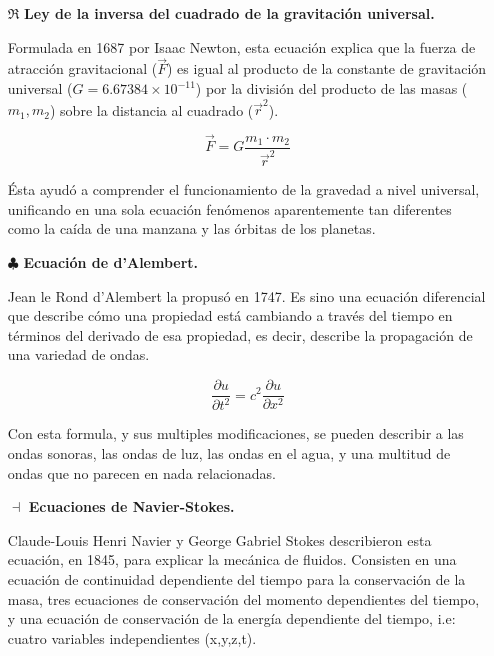 \documentclass[12pt,letterpaper]{article}
\begin{document}
\begin{itemize}

    \item[$\Re$] \textbf{Ley de la inversa del cuadrado de la gravitación universal.}\newline
    
    Formulada en 1687 por Isaac Newton, esta ecuación explica que la fuerza de atracción gravitacional ($\vec{F}$) es igual al producto de la constante de gravitación universal ($G=6.67384\times 10^{-11}$) por la división del producto de las masas ($m_{1},m_{2}$) sobre la distancia al cuadrado ($\vec{r}^{2}$).
    
    $$\vec{F}=G\frac{m_{1}\cdot m_{2}}{\vec{r}^{2}}$$

    Ésta ayudó a comprender el funcionamiento de la gravedad a nivel universal, unificando en una sola ecuación fenómenos aparentemente tan diferentes como la caída de una manzana y las órbitas de los planetas.\newline
    
    \item[$\clubsuit$] \textbf{Ecuación de d'Alembert.}\newline
    
    Jean le Rond d'Alembert la propusó en 1747. Es sino una ecuación diferencial que describe cómo una propiedad está cambiando a través del tiempo en términos del derivado de esa propiedad, es decir, describe la propagación de una variedad de ondas.

    $$\frac{\partial u}{\partial t^{2}}=c^{2}\frac{\partial u}{\partial x^{2}}$$

    Con esta formula, y sus multiples modificaciones, se pueden describir a las ondas sonoras, las ondas de luz, las ondas en el agua, y una multitud de ondas que no parecen en nada relacionadas.\newline
    
    \item[$\dashv$] \textbf{Ecuaciones de Navier-Stokes.}\newline
    
    Claude-Louis Henri Navier y George Gabriel Stokes describieron esta ecuación, en 1845, para explicar la mecánica de fluidos. Consisten en una ecuación de continuidad dependiente del tiempo para la conservación de la masa, tres ecuaciones de conservación del momento dependientes del tiempo, y una ecuación de conservación de la energía dependiente del tiempo, i.e: cuatro variables independientes (x,y,z,t).


\end{itemize}
\end{document}

